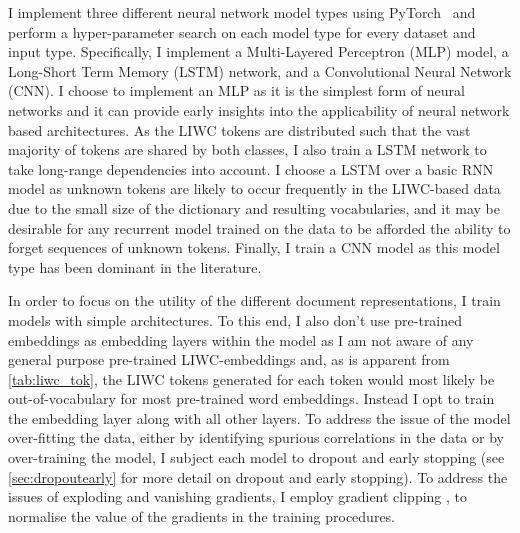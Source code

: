 I implement three different neural network model types using PyTorch~\citep{Paszke:2019} and perform a hyper-parameter search on each model type for every dataset and input type. Specifically, I implement a Multi-Layered Perceptron (MLP) model, a Long-Short Term Memory (LSTM) network, and a Convolutional Neural Network (CNN).
I choose to implement an MLP as it is the simplest form of neural networks and it can provide early insights into the applicability of neural network based architectures.
As the LIWC tokens are distributed such that the vast majority of tokens are shared by both classes, I also train a LSTM network to take long-range dependencies into account. I choose a LSTM over a basic RNN model as unknown tokens are likely to occur frequently in the LIWC-based data due to the small size of the dictionary and resulting vocabularies, and it may be desirable for any recurrent model trained on the data to be afforded the ability to forget sequences of unknown tokens.
Finally, I train a CNN model as this model type has been dominant in the literature.

In order to focus on the utility of the different document representations, I train models with simple architectures. To this end, I also don't use pre-trained embeddings as embedding layers within the model as I am not aware of any general purpose pre-trained LIWC-embeddings and, as is apparent from \cref{tab:liwc_tok}, the LIWC tokens generated for each token would most likely be out-of-vocabulary for most pre-trained word embeddings. Instead I opt to train the embedding layer along with all other layers.
To address the issue of the model over-fitting the data, either by identifying spurious correlations in the data or by over-training the model, I subject each model to dropout and early stopping (see \cref{sec:dropoutearly} for more detail on dropout and early stopping). To address the issues of exploding and vanishing gradients, I employ gradient clipping \citep{Bengio:1994}, to normalise the value of the gradients in the training procedures.\vspace{5mm}

